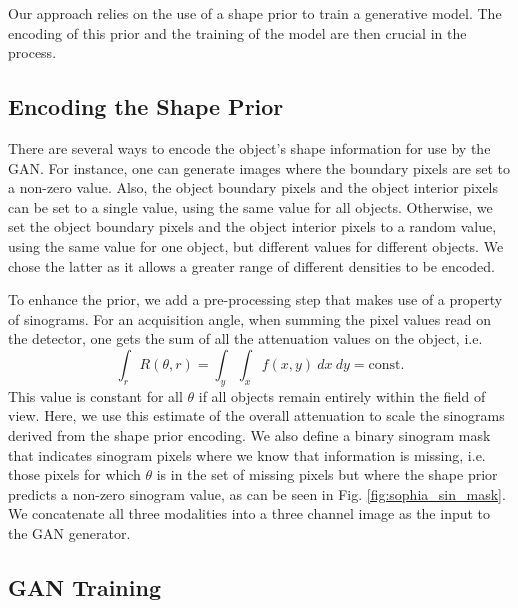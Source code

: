 \documentclass[../main.tex]{subfiles}
\begin{document}
Our approach relies on the use of a shape prior to train a generative model. The encoding of this prior and the training of the model are then crucial in the process.

\subsection{Encoding the Shape Prior}
\label{encoding_the_shape_prior}

There are several ways to encode the object's shape information for use by the GAN. For instance, one can generate images where the boundary pixels are set to a non-zero value. Also, the object boundary pixels and the object interior pixels can be set to a single value, using the same value for all objects. Otherwise, we set the object boundary pixels and the object interior pixels to a random value, using the same value for one object, but different values for different objects. We chose the latter as it allows a greater range of different densities to be encoded.

To enhance the prior, we add a pre-processing step that makes use of a property of sinograms. For an acquisition angle, when summing the pixel values read on the detector, one gets the sum of all the attenuation values on the object, i.e. 
\begin{equation}
\int_r R(\theta,r) = \int_y \int_x f(x,y) \ dx \  dy = \mathrm{const}.
\end{equation} 
This value is constant for all $\theta$ if all objects remain entirely within the field of view. Here, we use this estimate of the overall attenuation to scale the sinograms derived from the shape prior encoding. We also define a binary sinogram mask that indicates sinogram pixels where we know that information is missing, i.e. those pixels for which $\theta$ is in the set of missing pixels but where the shape prior predicts a non-zero sinogram value, as can be seen in Fig. \ref{fig:sophia_sin_mask}. We concatenate all three modalities into a three channel image as the input to the GAN generator.
 
\subsection{GAN Training}
\end{document}
